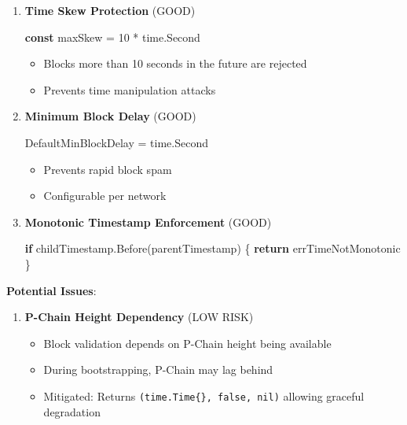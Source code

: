 \documentclass[
]{article}
\newenvironment{Shaded}{}{}
\newcommand{\ControlFlowTok}[1]{\textcolor[rgb]{0.00,0.44,0.13}{\textbf{#1}}}
\newcommand{\DecValTok}[1]{\textcolor[rgb]{0.25,0.63,0.44}{#1}}
\newcommand{\KeywordTok}[1]{\textcolor[rgb]{0.00,0.44,0.13}{\textbf{#1}}}
\newcommand{\NormalTok}[1]{#1}
\newcommand{\OperatorTok}[1]{\textcolor[rgb]{0.40,0.40,0.40}{#1}}
\providecommand{\tightlist}{%
  \setlength{\itemsep}{0pt}\setlength{\parskip}{0pt}}
\begin{document}
\begin{enumerate}
\def\labelenumi{\arabic{enumi}.}
\item
  \textbf{Time Skew Protection} (GOOD)

\begin{Shaded}
\begin{Highlighting}[]
\KeywordTok{const}\NormalTok{ maxSkew }\OperatorTok{=} \DecValTok{10} \OperatorTok{*}\NormalTok{ time}\OperatorTok{.}\NormalTok{Second}
\end{Highlighting}
\end{Shaded}

  \begin{itemize}
  \tightlist
  \item
    Blocks more than 10 seconds in the future are rejected
  \item
    Prevents time manipulation attacks
  \end{itemize}
\item
  \textbf{Minimum Block Delay} (GOOD)

\begin{Shaded}
\begin{Highlighting}[]
\NormalTok{DefaultMinBlockDelay }\OperatorTok{=}\NormalTok{ time}\OperatorTok{.}\NormalTok{Second}
\end{Highlighting}
\end{Shaded}

  \begin{itemize}
  \tightlist
  \item
    Prevents rapid block spam
  \item
    Configurable per network
  \end{itemize}
\item
  \textbf{Monotonic Timestamp Enforcement} (GOOD)

\begin{Shaded}
\begin{Highlighting}[]
\ControlFlowTok{if}\NormalTok{ childTimestamp}\OperatorTok{.}\NormalTok{Before}\OperatorTok{(}\NormalTok{parentTimestamp}\OperatorTok{)} \OperatorTok{\{}
    \ControlFlowTok{return}\NormalTok{ errTimeNotMonotonic}
\OperatorTok{\}}
\end{Highlighting}
\end{Shaded}
\end{enumerate}

\textbf{Potential Issues}:

\begin{enumerate}
\def\labelenumi{\arabic{enumi}.}
\tightlist
\item
  \textbf{P-Chain Height Dependency} (LOW RISK)

  \begin{itemize}
  \tightlist
  \item
    Block validation depends on P-Chain height being available
  \item
    During bootstrapping, P-Chain may lag behind
  \item
    Mitigated: Returns \texttt{(time.Time\{\},\ false,\ nil)} allowing
    graceful degradation
  \end{itemize}
\end{enumerate}
\end{document}
